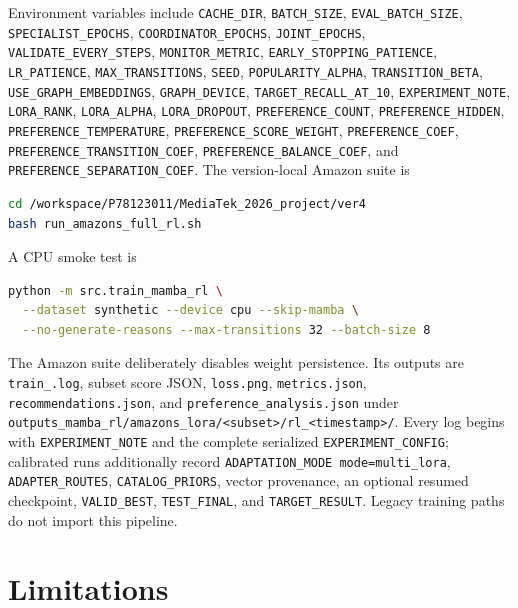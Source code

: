 \documentclass[11pt,a4paper]{article}
\begin{document}
Environment variables include \texttt{CACHE\_DIR},
\texttt{BATCH\_SIZE}, \texttt{EVAL\_BATCH\_SIZE},
\texttt{SPECIALIST\_EPOCHS}, \texttt{COORDINATOR\_EPOCHS},
\texttt{JOINT\_EPOCHS}, \texttt{VALIDATE\_EVERY\_STEPS},
\texttt{MONITOR\_METRIC}, \texttt{EARLY\_STOPPING\_PATIENCE},
\texttt{LR\_PATIENCE}, \texttt{MAX\_TRANSITIONS}, \texttt{SEED},
\texttt{POPULARITY\_ALPHA}, \texttt{TRANSITION\_BETA},
\texttt{USE\_GRAPH\_EMBEDDINGS}, \texttt{GRAPH\_DEVICE},
\texttt{TARGET\_RECALL\_AT\_10}, \texttt{EXPERIMENT\_NOTE},
\texttt{LORA\_RANK}, \texttt{LORA\_ALPHA}, \texttt{LORA\_DROPOUT},
\texttt{PREFERENCE\_COUNT}, \texttt{PREFERENCE\_HIDDEN},
\texttt{PREFERENCE\_TEMPERATURE}, \texttt{PREFERENCE\_SCORE\_WEIGHT},
\texttt{PREFERENCE\_COEF}, \texttt{PREFERENCE\_TRANSITION\_COEF},
\texttt{PREFERENCE\_BALANCE\_COEF}, and
\texttt{PREFERENCE\_SEPARATION\_COEF}. The version-local Amazon suite is
\begin{lstlisting}[language=bash]
cd /workspace/P78123011/MediaTek_2026_project/ver4
bash run_amazons_full_rl.sh
\end{lstlisting}
A CPU smoke test is
\begin{lstlisting}[language=bash]
python -m src.train_mamba_rl \
  --dataset synthetic --device cpu --skip-mamba \
  --no-generate-reasons --max-transitions 32 --batch-size 8
\end{lstlisting}

The Amazon suite deliberately disables weight persistence. Its outputs are
\texttt{train\_<run-id>.log}, subset score JSON, \texttt{loss.png},
\texttt{metrics.json}, \texttt{recommendations.json}, and
\texttt{preference\_analysis.json} under
\texttt{outputs\_mamba\_rl/amazons\_lora/<subset>/rl\_<timestamp>/}. Every log begins with
\texttt{EXPERIMENT\_NOTE} and the complete serialized
\texttt{EXPERIMENT\_CONFIG}; calibrated runs additionally record
\texttt{ADAPTATION\_MODE mode=multi\_lora}, \texttt{ADAPTER\_ROUTES},
\texttt{CATALOG\_PRIORS}, vector provenance, an optional resumed checkpoint,
\texttt{VALID\_BEST}, \texttt{TEST\_FINAL}, and
\texttt{TARGET\_RESULT}. Legacy training paths do not import this pipeline.

\section{Limitations}
\end{document}
